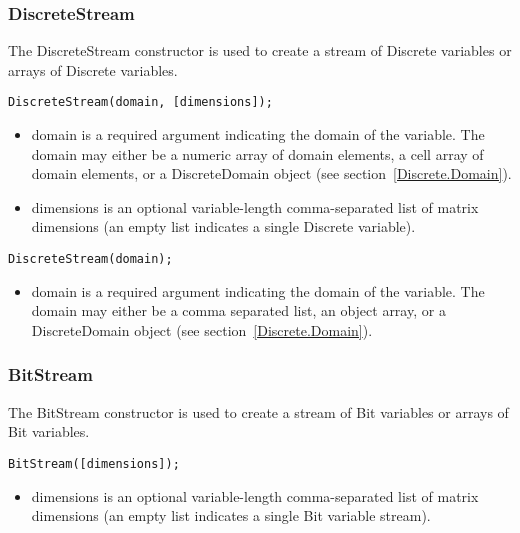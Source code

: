 \subsubsection{DiscreteStream}

\label{DiscreteStream.Constructor}

The DiscreteStream constructor is used to create a stream of Discrete variables or arrays of Discrete variables.

\ifmatlab
\begin{lstlisting}
DiscreteStream(domain, [dimensions]);
\end{lstlisting}

\begin{itemize}
\item domain is a required argument indicating the domain of the variable.  The domain may either be a numeric array of domain elements, a cell array of domain elements, or a DiscreteDomain object (see section~\ref{Discrete.Domain}).
\item dimensions is an optional variable-length comma-separated list of matrix dimensions (an empty list indicates a single Discrete variable).
\end{itemize}

\fi

\ifjava
\begin{lstlisting}
DiscreteStream(domain);
\end{lstlisting}

\begin{itemize}
\item domain is a required argument indicating the domain of the variable.  The domain may either be a comma separated list, an object array, or a DiscreteDomain object (see section~\ref{Discrete.Domain}).
\end{itemize}
\fi

\subsubsection{BitStream}


The BitStream constructor is used to create a stream of Bit variables or arrays of Bit variables.

\ifmatlab
\begin{lstlisting}
BitStream([dimensions]);
\end{lstlisting}

\begin{itemize}
\item dimensions is an optional variable-length comma-separated list of matrix dimensions (an empty list indicates a single Bit variable stream).
\end{itemize}
\fi

